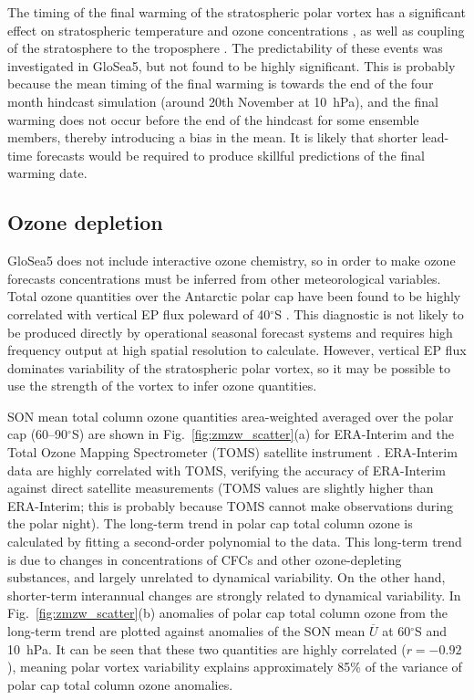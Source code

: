 The timing of the final warming of the stratospheric polar vortex has a
significant effect on stratospheric temperature and ozone concentrations
\citep{Yamazaki1987}, as well as coupling of the stratosphere to the troposphere
\citep{Black2007}. The predictability of these events was investigated in
GloSea5, but not found to be highly significant. This is probably because the
mean timing of the final warming is towards the end of the four month hindcast
simulation (around 20th November at 10~hPa), and the final warming does not
occur before the end of the hindcast for some ensemble members, thereby
introducing a bias in the mean. It is likely that shorter lead-time forecasts
would be required to produce skillful predictions of the final warming date.


\subsection{Ozone depletion}

GloSea5 does not include interactive ozone chemistry, so in order to make ozone
forecasts concentrations must be inferred from other meteorological
variables. Total ozone quantities over the Antarctic polar cap have been found
to be highly correlated with vertical EP flux poleward of 40$^{\circ}$S
\citep{Weber2011, Salby2012}. This diagnostic is not likely to be produced
directly by operational seasonal forecast systems and requires high frequency
output at high spatial resolution to calculate. However, vertical EP flux
dominates variability of the stratospheric polar vortex, so it may be possible
to use the strength of the vortex to infer ozone quantities.

SON mean total column ozone quantities area-weighted averaged over the polar cap
(60--90$^{\circ}$S) are shown in Fig.\ \ref{fig:zmzw_scatter}(a) for ERA-Interim
and the Total Ozone Mapping Spectrometer (TOMS) satellite instrument
\citep{Kroon2008}. ERA-Interim data are highly correlated with TOMS, verifying
the accuracy of ERA-Interim against direct satellite measurements (TOMS values
are slightly higher than ERA-Interim; this is probably because TOMS cannot make
observations during the polar night). The long-term trend in polar cap total
column ozone is calculated by fitting a second-order polynomial to the
data. This long-term trend is due to changes in concentrations of CFCs and other
ozone-depleting substances, and largely unrelated to dynamical variability. On
the other hand, shorter-term interannual changes are strongly related to
dynamical variability. In Fig.\ \ref{fig:zmzw_scatter}(b) anomalies of polar cap
total column ozone from the long-term trend are plotted against anomalies of the
SON mean $\overline{U}$ at 60$^{\circ}$S and 10~hPa. It can be seen that these
two quantities are highly correlated ($r=-0.92$), meaning polar vortex
variability explains approximately 85\% of the variance of polar cap total
column ozone anomalies.

